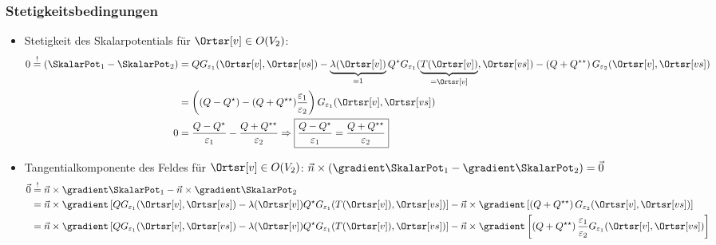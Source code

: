     \begin{frame}
      \frametitle{Stetigkeitsbedingungen}
      \begin{itemize}[<+->]
      \item Stetigkeit des Skalarpotentials für $\Ortsr[v]\in O(V_2)$:
\begin{align*}
0 \stackrel{!}{=}  (\SkalarPot_1 - \SkalarPot_2 ) & =   Q G_{\varepsilon_1}(\Ortsr[v], \Ortsr[vs]) - \underbrace{\lambda(\Ortsr[v])}_{=1} Q^\star G_{\varepsilon_1}(\underbrace{T(\Ortsr[v])}_{=\Ortsr[v]}, \Ortsr[vs])
                                                        -\left( Q +  Q^{\star\star}\right) G_{\varepsilon_2}(\Ortsr[v], \Ortsr[vs])\\
                                                      & = \left( (Q-Q^\star) -(Q+Q^{\star\star})\frac{\varepsilon_1}{\varepsilon_2}   \right) G_{\varepsilon_1}(\Ortsr[v], \Ortsr[vs])\\
  0 &= \frac{Q-Q^\star}{\varepsilon_1} -\frac{Q+Q^{\star\star}}{\varepsilon_2} \Rightarrow \boxed{\frac{Q-Q^\star}{\varepsilon_1} = \frac{Q+Q^{\star\star}}{\varepsilon_2}}  
\end{align*}
\item Tangentialkomponente des Feldes für $\Ortsr[v]\in O(V_2)$: $\vec{n}\times (\gradient\SkalarPot_1 - \gradient\SkalarPot_2 ) =\vec{0}$
  \begin{align*}
    \vec{0} & \stackrel{!}{=} \vec{n}\times \gradient\SkalarPot_1 - \vec{n}\times \gradient\SkalarPot_2 \\
      & = \vec{n}\times \gradient \left[ Q G_{\varepsilon_1}(\Ortsr[v], \Ortsr[vs]) - \lambda(\Ortsr[v]) Q^\star G_{\varepsilon_1}(T(\Ortsr[v]), \Ortsr[vs]) \right]
        - \vec{n}\times \gradient \left[ \left( Q +  Q^{\star\star}\right) G_{\varepsilon_2}(\Ortsr[v], \Ortsr[vs]) \right]\\
      & = \vec{n}\times \gradient \left[ Q G_{\varepsilon_1}(\Ortsr[v], \Ortsr[vs]) - \lambda(\Ortsr[v]) Q^\star G_{\varepsilon_1}(T(\Ortsr[v]), \Ortsr[vs]) \right]
        - \vec{n}\times \gradient \left[ \left( Q +  Q^{\star\star}\right) \frac{\varepsilon_1}{\varepsilon_2} G_{\varepsilon_1}(\Ortsr[v], \Ortsr[vs]) \right]
    \end{align*}
  \end{itemize}
      \end{frame}

